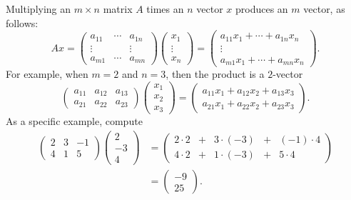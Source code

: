 \documentclass{ximera}
\begin{document}
Multiplying an $m\times n$ matrix $A$ times an $n$ vector $x$
produces an $m$ vector, as follows:
\begin{equation}  \label{Atimesx}
Ax=\left(
\begin{array}{ccc}
 a_{11}  & \cdots & a_{1n} \\
 \vdots  &        & \vdots  \\
 a_{m1}  & \cdots & a_{mn}
\end{array}
\right)
\left(
\begin{array}{c}
x_1 \\ \vdots \\ x_n
\end{array}
\right)
=
\left(
\begin{array}{c}
a_{11}x_1 + \cdots + a_{1n}x_n \\ \vdots \\
a_{m1}x_1 + \cdots + a_{mn}x_n
\end{array}
\right).
\end{equation}
For example, when $m=2$ and $n=3$, then the product is a $2$-vector
\begin{equation} \label{Atimesx231}
\left(
\begin{array}{ccc}
 a_{11}  & a_{12} & a_{13} \\
 a_{21}  & a_{22} & a_{23}
\end{array}
\right)
\left(
\begin{array}{c}
x_1 \\ x_2 \\ x_3
\end{array}
\right)
=
\left(
\begin{array}{c}
a_{11}x_1 + a_{12}x_2 + a_{13}x_3 \\
a_{21}x_1 + a_{22}x_2 + a_{23}x_3
\end{array}
\right).
\end{equation}
As a specific example, compute
\begin{align*}
\left(
\begin{matrix}
 2  & 3 & -1 \\
 4  & 1 &  5
\end{matrix}
\right)
\left(
\begin{matrix}
2 \\ -3 \\ 4
\end{matrix}
\right)
&=
\left(
\begin{matrix}
2\cdot 2 & + & 3\cdot(-3) & + & (-1)\cdot 4 \\
4\cdot 2 & + & 1\cdot(-3) & + & 5\cdot 4
\end{matrix}
\right) \\
&=
\left(
\begin{matrix}
-9 \\ 25
\end{matrix}
\right).
\end{align*}
\end{document}
